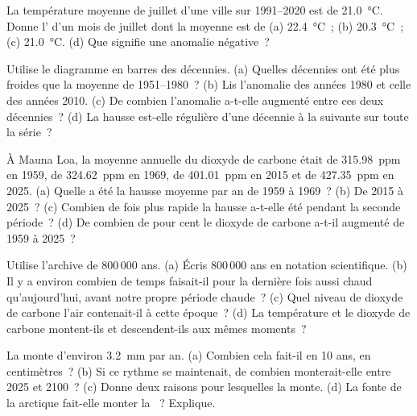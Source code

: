 \begin{exercise}[$\star$]\label{exo:g9:climate-past-and-present:4}
La température moyenne de juillet d'une ville sur 1991--2020 est de
\qty{21.0}{\degreeCelsius}. Donne l' d'un mois de
juillet dont la moyenne est de (a) \qty{22.4}{\degreeCelsius}~;
(b) \qty{20.3}{\degreeCelsius}~; (c) \qty{21.0}{\degreeCelsius}. (d) Que
signifie une anomalie négative~?
\end{exercise}

\begin{exercise}[$\star\star$]\label{exo:g9:climate-past-and-present:5}
Utilise le diagramme en barres des décennies. (a) Quelles décennies ont
été plus froides que la moyenne de 1951--1980~? (b) Lis l'anomalie des
années 1980 et celle des années 2010. (c) De combien l'anomalie a-t-elle
augmenté entre ces deux décennies~? (d) La hausse est-elle régulière d'une
décennie à la suivante sur toute la série~?
\end{exercise}

\begin{exercise}[$\star\star$]\label{exo:g9:climate-past-and-present:6}
À Mauna Loa, la moyenne annuelle du dioxyde de carbone était de
\qty{315.98}{ppm} en 1959, de \qty{324.62}{ppm} en 1969, de
\qty{401.01}{ppm} en 2015 et de \qty{427.35}{ppm} en 2025. (a) Quelle a été
la hausse moyenne par an de 1959 à 1969~? (b) De 2015 à 2025~? (c) Combien
de fois plus rapide la hausse a-t-elle été pendant la seconde période~?
(d) De combien de pour cent le dioxyde de carbone a-t-il augmenté de 1959
à 2025~?
\end{exercise}

\begin{exercise}[$\star\star$]\label{exo:g9:climate-past-and-present:7}
Utilise l'archive de 800\,000 ans. (a) Écris 800\,000 ans en notation
scientifique. (b) Il y a environ combien de temps faisait-il pour la
dernière fois aussi chaud qu'aujourd'hui, avant notre propre période
chaude~? (c) Quel niveau de dioxyde de carbone l'air contenait-il à cette
époque~? (d) La température et le dioxyde de carbone montent-ils et
descendent-ils aux mêmes moments~?
\end{exercise}

\begin{exercise}[$\star\star$]\label{exo:g9:climate-past-and-present:8}
La  monte d'environ \qty{3.2}{mm} par an. (a) Combien cela fait-il en
10 ans, en centimètres~? (b) Si ce rythme se maintenait, de combien
monterait-elle entre 2025 et 2100~? (c) Donne deux raisons pour lesquelles
la  monte. (d) La fonte de la  arctique fait-elle monter la
~? Explique.
\end{exercise}


